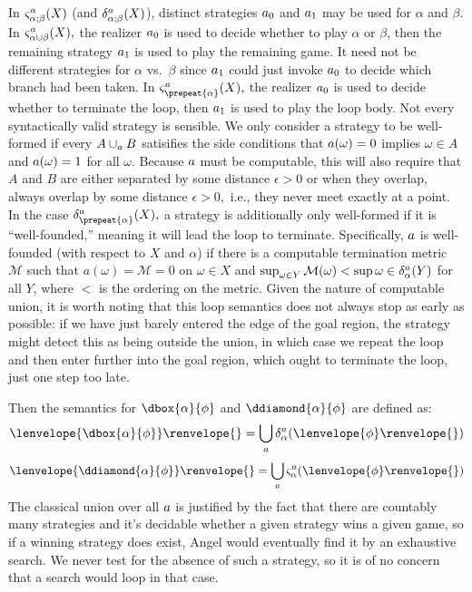 \documentclass[12pt]{cmuthesis}
\theoremstyle{definition}
\theoremstyle{remark}
\newcommand{\om}{\omega}
\newcommand{\fint}[1]{\lenvelope{#1}\renvelope}
\begin{document}
In $\strategyforR[\alpha;\beta]{\aa}{X}$ (and $\dstrategyforR[\alpha;\beta]{\aa}{X}$), distinct strategies $\rzFst{\aa}$ and $\rzSnd{\aa}$ may be used for $\alpha$ and $\beta$.
In $\strategyforR[\alpha\cup\beta]{\aa}{X},$ the realizer $\rzFst{\aa}$ is used to decide whether to play $\alpha$ or $\beta$, then the remaining strategy $\rzSnd{\aa}$ is used to play the remaining game.
It need not be different strategies for $\alpha$ vs.\ $\beta$ since $\rzSnd{\aa}$ could just invoke $\rzFst{\aa}$ to decide which branch had been taken.
In $\strategyforR[\prepeat{\alpha}]{\aa}{X},$ the realizer $\rzFst{\aa}$ is used to decide whether to terminate the loop, then $\rzSnd{\aa}$ is used to play the loop body.
Not every syntactically valid strategy is sensible.
We only consider a strategy to be well-formed if every $A \cup_\aa B$ satisifies the side conditions that $\aa(\om)=0$ implies $\om \in A$ and $\aa(\om)=1$ for all $\om$. 
Because $\aa$ must be computable, this will also require that $A$ and $B$ are either separated by some distance $\epsilon > 0$ or when they overlap, always overlap by some distance $\epsilon > 0,$ i.e., they never meet exactly at a point.
In the case $\dstrategyforR[\prepeat{\alpha}]{\aa}{X},$ a strategy is additionally only well-formed if it is ``well-founded,'' meaning it will lead the loop to terminate.
Specifically, $\aa$ is well-founded (with respect to $X$ and $\alpha$) if there is a computable termination metric $\mathcal{M}$ such that $a(\om) = \mathcal{M}=0$ on $\om \in X$ and $\sup_{\om \in Y}\mathcal{M}(\om) < \sup{\om \in \dstrategyforR[\alpha]{\aa}{Y}}$ for all $Y$, where $<$ is the ordering on the metric.
Given the nature of computable union, it is worth noting that this loop semantics does not always stop as early as possible: if we have just barely entered the edge of the goal region, the strategy might detect this as being outside the union, in which case we repeat the loop and then enter further into the goal region, which ought to terminate the loop, just one step too late.

Then the semantics for $\dbox{\alpha}{\phi}$ and $\ddiamond{\alpha}{\phi}$ are defined as:
\[\fint{\dbox{\alpha}{\phi}}{} = \bigcup_\aa \dstrategyforR[\alpha]{\aa}{\fint{\phi}{}}\]
\[\fint{\ddiamond{\alpha}{\phi}}{} = \bigcup_\aa \strategyforR[\alpha]{\aa}{\fint{\phi}{}}\]
The classical union over all $\aa$ is justified by the fact that there are countably many strategies and it's decidable whether a given strategy wins a given game, so if a winning strategy does exist, Angel would eventually find it by an exhaustive search. We never test for the absence of such a strategy, so it is of no concern that a search would loop in that case.
\end{document}
